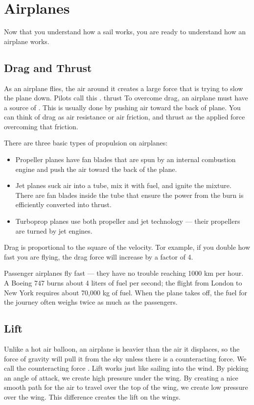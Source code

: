 \chapter{Airplanes}

Now that you understand how a sail works,  you are ready to understand how an airplane works.

\section{Drag and Thrust}

As an airplane flies, the air around it creates a large force that is trying to slow the
plane down.  Pilots call this .
{thrust}
To overcome drag, an airplane must have a source of .  This is usually done by pushing air toward the back of plane. You can think of drag as air resistance or air friction, and thrust as the applied force overcoming that friction.

There are three basic types of propulsion on airplanes:

\begin{itemize}
\item Propeller planes have fan blades that are spun by an internal combustion engine and push the air toward the back of the plane.
\item Jet planes suck air into a tube,  mix it with fuel,  and ignite the mixture.  There are fan blades inside the tube that ensure
the power from the burn is efficiently converted into thrust.
\item Turboprop planes use both propeller and jet technology --- their propellers are turned by jet engines.
\end{itemize}
Drag is proportional to the square of the velocity. Tor example, if you double how fast you are flying, the drag force will increase by a factor of 4.

Passenger airplanes fly fast --- they have no trouble reaching 1000 km per hour. A Boeing 747 burns about 4 liters of fuel per second; the flight from London to New York requires about 70,000 kg of fuel.  When the plane takes off,  the fuel for the journey often weighs twice as much as the passengers.

\section{Lift}

Unlike a hot air balloon, an airplane is heavier than the
air it displaces, so the force of gravity will pull it from the sky unless there is a counteracting force.  We call the counteracting force .
Lift works just like sailing into the wind. By picking an angle of attack, we create high pressure under the wing.  By creating a nice smooth path for the
air to travel over the top of the wing,  we create low pressure over the wing.  This difference creates the lift on the wings.

